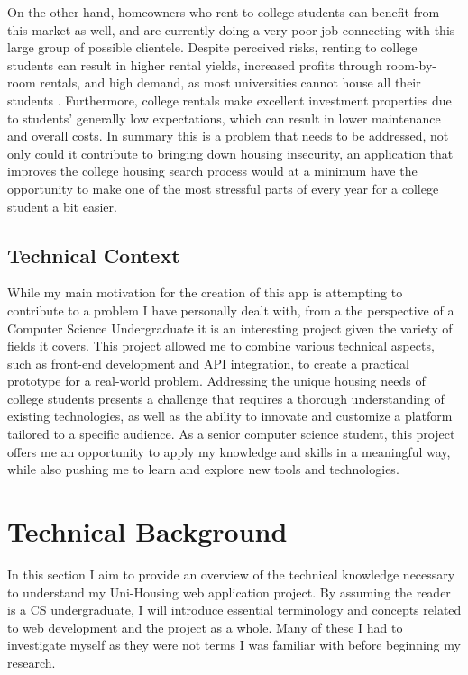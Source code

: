 \documentclass[10pt,twocolumn]{article}
\begin{document}
On the other hand, homeowners who rent to college students can benefit from this market as well, and are currently doing a very poor job connecting with this large group of possible clientele. Despite perceived risks, renting to college students can result in higher rental yields, increased profits through room-by-room rentals, and high demand, as most universities cannot house all their students \cite{FortuneBuilder}. Furthermore, college rentals make excellent investment properties due to students' generally low expectations, which can result in lower maintenance and overall costs. \cite{zaransky2006profit} In summary this is a problem that needs to be addressed, not only could it contribute to bringing down housing insecurity, an application that improves the college housing search process would at a minimum have the opportunity to make one of the most stressful parts of every year for a college student a bit easier. 

\subsection{Technical Context}
While my main motivation for the creation of this app is attempting to contribute to a problem I have personally dealt with, from a the perspective of a Computer Science Undergraduate it is an interesting project given the variety of fields it covers. This project allowed me to combine various technical aspects, such as front-end development and API integration, to create a practical prototype for a real-world problem. Addressing the unique housing needs of college students presents a challenge that requires a thorough understanding of existing technologies, as well as the ability to innovate and customize a platform tailored to a specific audience. As a senior computer science student, this project offers me an opportunity to apply my knowledge and skills in a meaningful way, while also pushing me to learn and explore new tools and technologies. 

\section{Technical Background}
In this section I aim to provide an overview of the technical knowledge necessary to understand my Uni-Housing web application project. By assuming the reader is a CS undergraduate, I will introduce essential terminology and concepts related to web development and the project as a whole. Many of these I had to investigate myself as they were not terms I was familiar with before beginning my research.
\end{document}
